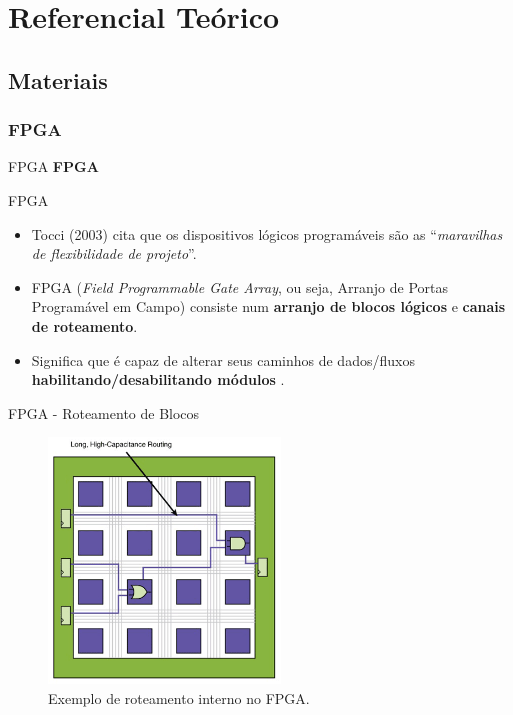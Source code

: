 \section{Referencial Teórico}
	\subsection{Materiais}
	\subsubsection{FPGA}
	\begin{frame}{FPGA}
		\centering \color{blue} {\Huge \textbf{FPGA} \\[0.5cm]}%
	\end{frame}
	\begin{frame}{FPGA}
		\begin{itemize}
  			\setlength\itemsep{1em}
			\item Tocci (2003) cita que os dispositivos lógicos programáveis são as ``\textit{maravilhas de flexibilidade de projeto}''.
			\item FPGA (\textit{Field Programmable Gate Array}, ou seja, Arranjo de Portas Programável em Campo) consiste num \textbf{arranjo de blocos lógicos} e \textbf{canais de roteamento}.
			\item Significa que é capaz de alterar seus caminhos de dados/fluxos \textbf{habilitando/desabilitando módulos} \cite{moreira2008plataforma}.
		\end{itemize}
	\end{frame}
	\begin{frame}{FPGA - Roteamento de Blocos}
		\begin{figure}[p]
			\centering
			\includegraphics[width=0.55\textwidth]{img/fpga/exemploInicial.png}
			\caption{Exemplo de roteamento interno no FPGA.}
			\label{fig:fpgaHardware}
		\end{figure}
	\end{frame}
